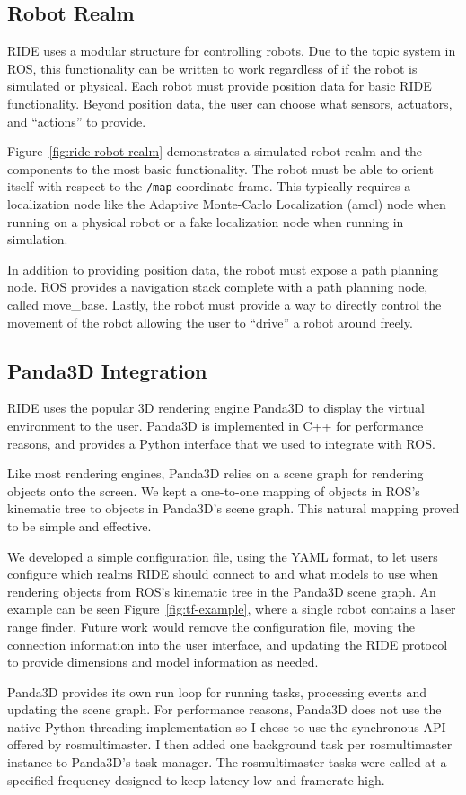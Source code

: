 \subsection{Robot Realm}
\label{section:robot-architecture}
RIDE uses a modular structure for controlling robots. Due to the topic system in ROS, this functionality can be written to work regardless of if the robot is simulated or physical. Each robot must provide position data for basic RIDE functionality. Beyond position data, the user can choose what sensors, actuators, and ``actions'' to provide.

Figure~\ref{fig:ride-robot-realm} demonstrates a simulated robot realm and the components to the most basic functionality. The robot must be able to orient itself with respect to the \verb!/map! coordinate frame. This typically requires a localization node like the Adaptive Monte-Carlo Localization (amcl) node when running on a physical robot or a fake localization node when running in simulation.

In addition to providing position data, the robot must expose a path planning node. ROS provides a navigation stack complete with a path planning node, called move\_base. Lastly, the robot must provide a way to directly control the movement of the robot allowing the user to ``drive'' a robot around freely.


\subsection{Panda3D Integration}

RIDE uses the popular 3D rendering engine Panda3D to display the virtual environment to the user. Panda3D is implemented in C++ for performance reasons, and provides a Python interface that we used to integrate with ROS. 

Like most rendering engines, Panda3D relies on a scene graph for rendering objects onto the screen. We kept a one-to-one mapping of objects in ROS's kinematic tree to objects in Panda3D's scene graph. This natural mapping proved to be simple and effective.

We developed a simple configuration file, using the YAML format, to let users configure which realms RIDE should connect to and what models to use when rendering objects from ROS's kinematic tree in the Panda3D scene graph. An example can be seen Figure~\ref{fig:tf-example}, where a single robot contains a laser range finder. Future work would remove the configuration file, moving the connection information into the user interface, and updating the RIDE protocol to provide dimensions and model information as needed.


Panda3D provides its own run loop for running tasks, processing events and updating the scene graph. For performance reasons, Panda3D does not use the native Python threading implementation so I chose to use the synchronous API offered by rosmultimaster. I then added one background task per rosmultimaster instance to Panda3D's task manager. The rosmultimaster tasks were called at a specified frequency designed to keep latency low and framerate high.
